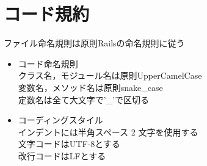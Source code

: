 \section{コード規約}
ファイル命名規則は原則Railsの命名規則に従う
\begin{itemize}
\item コード命名規則\\
クラス名，モジュール名は原則UpperCamelCase\\
変数名，メソッド名は原則snake\_case\\
定数名は全て大文字で'\_'で区切る\\
\item コーディングスタイル \\
インデントには半角スペース 2 文字を使用する \\
文字コードはUTF-8とする \\
改行コードはLFとする \\
\end{itemize}
